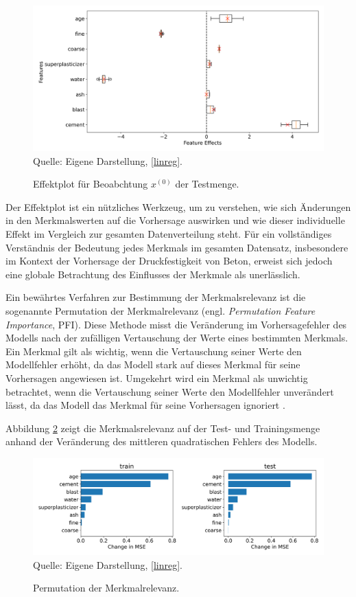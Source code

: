 \begin{figure}[!h]
    \caption{Effektplot für Beoabchtung $x^{(0)}$ der Testmenge.}
    \includegraphics[width=1\textwidth]{../scripts/images/feature_effects_boxplot.png}
    Quelle: Eigene Darstellung, \ref{linreg}.
    \label{pic:effect}
\end{figure}

Der Effektplot ist ein nützliches Werkzeug, um zu verstehen, wie sich Änderungen in den Merkmalswerten auf die Vorhersage 
auswirken und wie dieser individuelle Effekt im Vergleich zur gesamten Datenverteilung steht. Für ein vollständiges Verständnis 
der Bedeutung jedes Merkmals im gesamten Datensatz, insbesondere im Kontext der Vorhersage der Druckfestigkeit von Beton, 
erweist sich jedoch eine globale Betrachtung des Einflusses der Merkmale als unerlässlich.

Ein bewährtes Verfahren zur Bestimmung der 
Merkmalsrelevanz ist die sogenannte Permutation der Merkmalrelevanz (engl. \textit{Permutation Feature Importance}, PFI). 
Diese Methode misst die Veränderung im Vorhersagefehler des Modells nach der 
zufälligen Vertauschung der Werte eines bestimmten Merkmals. 
Ein Merkmal gilt als wichtig, wenn die Vertauschung seiner Werte den Modellfehler erhöht, 
da das Modell stark auf dieses Merkmal für seine Vorhersagen angewiesen ist. 
Umgekehrt wird ein Merkmal als unwichtig betrachtet, wenn die Vertauschung seiner Werte 
den Modellfehler unverändert lässt, da das Modell das Merkmal für seine Vorhersagen ignoriert \cite[S. 157]{Molnar_2022}. 

Abbildung \ref{pic:permutation} zeigt die Merkmalsrelevanz auf der Test- und Trainingsmenge 
anhand der Veränderung des mittleren quadratischen Fehlers des Modells.

\begin{figure}[!h]
    \caption{Permutation der Merkmalrelevanz.}
    \includegraphics[width=1\textwidth]{../scripts/images/permutation_importance.png}
    Quelle: Eigene Darstellung, \ref{linreg}.
    \label{pic:permutation}
\end{figure}

